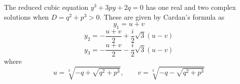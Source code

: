 \documentclass{article}
\begin{document}
The reduced cubic equation $y^3 + 3py +2q = 0$ has one real and two complex
solutions when $D = q^2 + p^3 > 0$. These are given by Cardan's formula as
\begin{equation} y_1 = u + v \end{equation}
\begin{equation} y_2 = -\frac{u+v}{2} + \frac{i}{2}\sqrt{3}(u-v) \end{equation}
\begin{equation} y_3 = -\frac{u+v}{2} - \frac{i}{2}\sqrt{3}(u-v) \end{equation}
where
\[ u = \sqrt[3]{-q + \sqrt{q^2+p^3}},\qquad v = \sqrt[3]{-q - \sqrt{q^2+p^3}} \]
\end{document}
